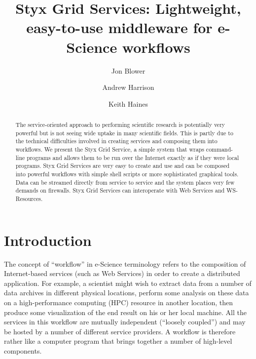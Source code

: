 \documentclass{llncs}
\begin{document}
%
\title{Styx Grid Services: Lightweight, easy-to-use middleware for e-Science workflows}
%
%
\author{Jon Blower \and Andrew Harrison
\and Keith Haines}
%
%
%

\maketitle              %

\begin{abstract}
The service-oriented approach to performing scientific research is potentially very powerful but is not seeing wide uptake in many scientific fields.  This is partly due to the technical difficulties involved in creating services and composing them into workflows.  We present the Styx Grid Service, a simple system that wraps command-line programs and allows them to be run over the Internet exactly as if they were local programs.  Styx Grid Services are very easy to create and use and can be composed into powerful workflows with simple shell scripts or more sophisticated graphical tools.  Data can be streamed directly from service to service and the system places very few demands on firewalls.  Styx Grid Services can interoperate with Web Services and WS-Resources.
\end{abstract}
%
\section{Introduction}
The concept of ``workflow'' in e-Science terminology refers to the composition of Internet-based services (such as Web Services) in order to create a distributed application.  For example, a scientist might wish to extract data from a number of data archives in different physical locations, perform some analysis on these data on a high-performance computing (HPC) resource in another location, then produce some visualization of the end result on his or her local machine.  All the services in this workflow are mutually independent (``loosely coupled'') and may be hosted by a number of different service providers.  A workflow is therefore rather like a computer program that brings together a number of high-level components.
\end{document}
